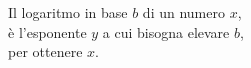 \documentclass[preview]{standalone}
\begin{document}
\begin{center}
Il logaritmo in base $b$ di un numero $x$,\\è l'esponente $y$ a cui bisogna elevare $b$,\\per ottenere $x$.
\end{center}
\end{document}
